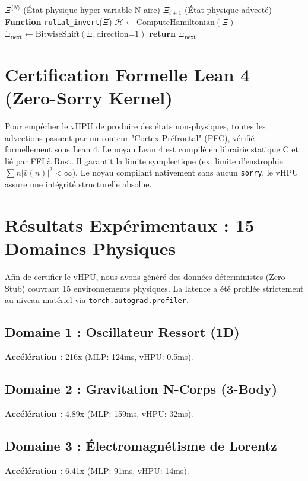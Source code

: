 \documentclass[11pt,a4paper]{article}
\begin{document}
\begin{algorithm}
\caption{API d'Inversion Ruliale Poly-Algébrique}\label{alg:vhpu}
\begin{algorithmic}[1]
\Require $\Xi^{\langle N \rangle}$ (État physique hyper-variable N-aire)
\Ensure $\Xi_{t+1}$ (État physique advecté)
\State \textbf{Function} \texttt{rulial\_invert}($\Xi$)
\State \quad $\mathcal{H} \gets \text{ComputeHamiltonian}(\Xi)$
\State \quad $\Xi_{\text{next}} \gets \text{BitwiseShift}(\Xi, \text{direction=1})$ 
\State \quad \textbf{return} $\Xi_{\text{next}}$
\end{algorithmic}
\end{algorithm}

\section{Certification Formelle Lean 4 (Zero-Sorry Kernel)}
Pour empêcher le vHPU de produire des états non-physiques, toutes les advections passent par un routeur "Cortex Préfrontal" (PFC), vérifié formellement sous Lean 4.
Le noyau Lean 4 est compilé en librairie statique C et lié par FFI à Rust. Il garantit la limite symplectique (ex: limite d'enstrophie $\sum n |\hat{v}(n)|^2 < \infty$). Le noyau compilant nativement sans aucun \texttt{sorry}, le vHPU assure une intégrité structurelle absolue.

\section{Résultats Expérimentaux : 15 Domaines Physiques}
Afin de certifier le vHPU, nous avons généré des données déterministes (Zero-Stub) couvrant 15 environnements physiques. La latence a été profilée strictement au niveau matériel via \texttt{torch.autograd.profiler}.

\subsection{Domaine 1 : Oscillateur Ressort (1D)}
\textbf{Accélération :} 216x (MLP: 124ms, vHPU: 0.5ms).

\subsection{Domaine 2 : Gravitation N-Corps (3-Body)}
\textbf{Accélération :} 4.89x (MLP: 159ms, vHPU: 32ms).

\subsection{Domaine 3 : Électromagnétisme de Lorentz}
\textbf{Accélération :} 6.41x (MLP: 91ms, vHPU: 14ms).
\end{document}

